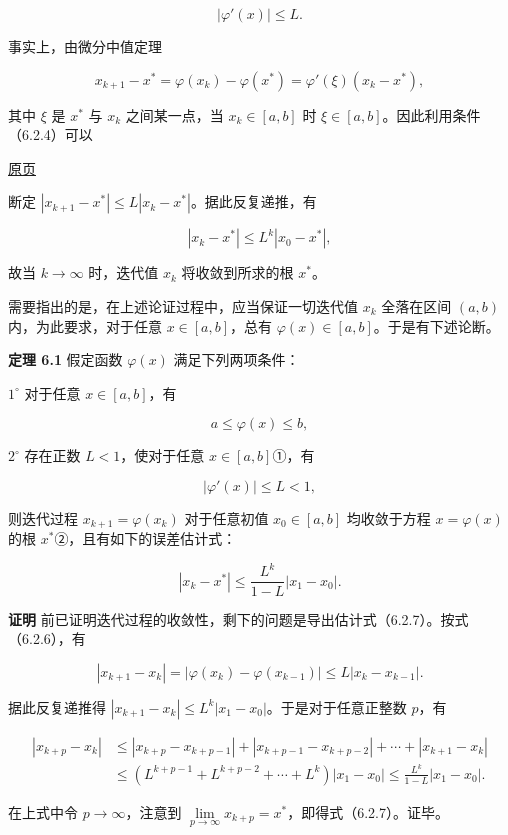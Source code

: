\documentclass[
  10pt,
  fontset=fandol]{ctexart}
\begin{document}
\[
|\varphi'(x)|\leqslant L.
\tag{6.2.4}
\]

事实上，由微分中值定理

\[
x_{k+1}-x^*=\varphi(x_k)-\varphi(x^*)=\varphi'(\xi)(x_k-x^*),
\]

其中 \(\xi\) 是 \(x^*\) 与 \(x_k\) 之间某一点，当 \(x_k\in[a,b]\) 时 \(\xi\in[a,b]\)。因此利用条件（6.2.4）可以

\href{../../source-images/pdf-159.jpeg}{原页}

断定 \(|x_{k+1}-x^*|\leqslant L|x_k-x^*|\)。据此反复递推，有

\[
|x_k-x^*|\leqslant L^k|x_0-x^*|,
\]

故当 \(k\to\infty\) 时，迭代值 \(x_k\) 将收敛到所求的根 \(x^*\)。

需要指出的是，在上述论证过程中，应当保证一切迭代值 \(x_k\) 全落在区间 \((a,b)\) 内，为此要求，对于任意 \(x\in[a,b]\)，总有 \(\varphi(x)\in[a,b]\)。于是有下述论断。

\textbf{定理 6.1} 假定函数 \(\varphi(x)\) 满足下列两项条件：

\(1^\circ\) 对于任意 \(x\in[a,b]\)，有

\[
a\leqslant\varphi(x)\leqslant b,
\tag{6.2.5}
\]

\(2^\circ\) 存在正数 \(L<1\)，使对于任意 \(x\in[a,b]\)①，有

\[
|\varphi'(x)|\leqslant L<1,
\tag{6.2.6}
\]

则迭代过程 \(x_{k+1}=\varphi(x_k)\) 对于任意初值 \(x_0\in[a,b]\) 均收敛于方程 \(x=\varphi(x)\) 的根 \(x^*\)②，且有如下的误差估计式：

\[
|x_k-x^*|\leqslant\frac{L^k}{1-L}|x_1-x_0|.
\tag{6.2.7}
\]

\textbf{证明} 前已证明迭代过程的收敛性，剩下的问题是导出估计式（6.2.7）。按式（6.2.6），有

\[
|x_{k+1}-x_k|=|\varphi(x_k)-\varphi(x_{k-1})|\leqslant L|x_k-x_{k-1}|.
\tag{6.2.8}
\]

据此反复递推得 \(|x_{k+1}-x_k|\leqslant L^k|x_1-x_0|\)。于是对于任意正整数 \(p\)，有

\[
\begin{aligned}
|x_{k+p}-x_k|&\leqslant|x_{k+p}-x_{k+p-1}|+|x_{k+p-1}-x_{k+p-2}|+\cdots+|x_{k+1}-x_k|\\
&\leqslant(L^{k+p-1}+L^{k+p-2}+\cdots+L^k)|x_1-x_0|\leqslant\frac{L^k}{1-L}|x_1-x_0|.
\end{aligned}
\]

在上式中令 \(p\to\infty\)，注意到 \(\lim\limits_{p\to\infty}x_{k+p}=x^*\)，即得式（6.2.7）。证毕。
\end{document}
